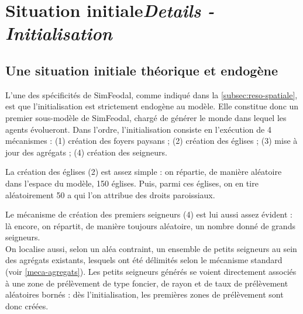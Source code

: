 \let\orisectionmark\sectionmark
\renewcommand\sectionmark[1]{}%
\section[Situation initiale -- \textit{Details - Initialisation}]{Situation initiale\protect\newline \large{\textit{Details - Initialisation}}\label{sec:initialisation}}
\orisectionmark{Situation initiale}
\let\sectionmark\orisectionmark

\subsection{Une situation initiale théorique et endogène}

L'une des spécificités de SimFeodal, comme indiqué dans la \cref{subsec:reso-spatiale}, est que l'initialisation est strictement endogène au modèle.
Elle constitue donc un premier \og sous-modèle\fg{} de SimFeodal, chargé de générer le monde dans lequel les agents évolueront.
Dans l'ordre, l'initialisation consiste en l'exécution de 4 mécanismes : (1) création des foyers paysans ; (2) création des églises ; (3) mise à jour des agrégats ; (4) création des seigneurs.

La création des églises (2) est assez simple : on répartie, de manière aléatoire dans l'espace du modèle, 150\unskip{} églises.
Puis, parmi ces églises, on en tire aléatoirement 50 a qui l'on attribue des droits paroissiaux.

Le mécanisme de création des premiers seigneurs (4) est lui aussi assez évident : là encore, on répartit, de manière toujours aléatoire, un nombre donné de grands seigneurs.\\
On localise aussi, selon un aléa contraint, un ensemble de petits seigneurs au sein des agrégats existants, lesquels ont été délimités selon le mécanisme standard (voir \cref{meca-agregats}).
Les petits seigneurs générés se voient directement associés à une zone de prélèvement de type \og foncier\fg{}, de rayon et de taux de prélèvement aléatoires bornés : dès l'initialisation, les premières zones de prélèvement sont donc créées.

